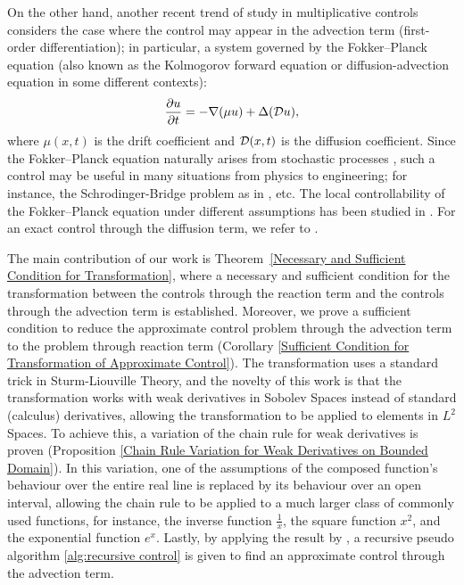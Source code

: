 \documentclass{ifacconf}
\begin{document}
On the other hand, another recent trend of study in multiplicative controls considers the case where the control may appear in the advection term (first-order differentiation); in particular, a system governed by the Fokker–Planck equation (also known as the Kolmogorov forward equation or diffusion-advection equation in some different contexts):
$$\frac{\partial u}{\partial t} = - \nabla(\mu u) + \Delta ({\mathcal D} u),$$ where $\mu(x,t)$ is the drift coefficient and ${\mathcal D}(x,t)$ is the diffusion coefficient. Since the Fokker–Planck equation naturally arises from stochastic processes  \cite{risken_fokker-planck_1996}, such a control may be useful in many situations from physics to engineering; for instance, the Schrodinger-Bridge problem as in \cite{chen_relation_2016}, etc. The local controllability of the Fokker–Planck equation under different assumptions has been studied in \cite{duprez_bilinear_2022, alabau-boussouira_bilinear_2024}. For an exact control through the diffusion term, we refer to \cite{barbu_controllability_2021}.

The main contribution of our work is Theorem~\ref{Necessary and Sufficient Condition for Transformation}, where a necessary and sufficient condition for the transformation between the controls through the reaction term and the controls through the advection term is established. Moreover, we prove a sufficient condition to reduce the approximate control problem through the advection term to the problem through reaction term (Corollary \ref{Sufficient Condition for Transformation of Approximate Control}). The transformation uses a standard trick in Sturm-Liouville Theory, and the novelty of this work is that the transformation works with weak derivatives in Sobolev Spaces instead of standard (calculus) derivatives, allowing the transformation to be applied to elements in $L^2$ Spaces. To achieve this, a variation of the chain rule for weak derivatives is proven (Proposition \ref{Chain Rule Variation for Weak Derivatives on Bounded Domain}). In this variation, one of the assumptions of the composed function's behaviour over the entire real line is replaced by its behaviour over an open interval, allowing the chain rule to be applied to a much larger class of commonly used functions, for instance, the inverse function $\frac{1}{x}$, the square function $x^2$, and the exponential function $e^x$. Lastly, by applying the result by \cite{khapalov_alexander_y_global_2002}, a recursive pseudo algorithm \ref{alg:recursive control} is given to find an approximate control through the advection term.
\end{document}
